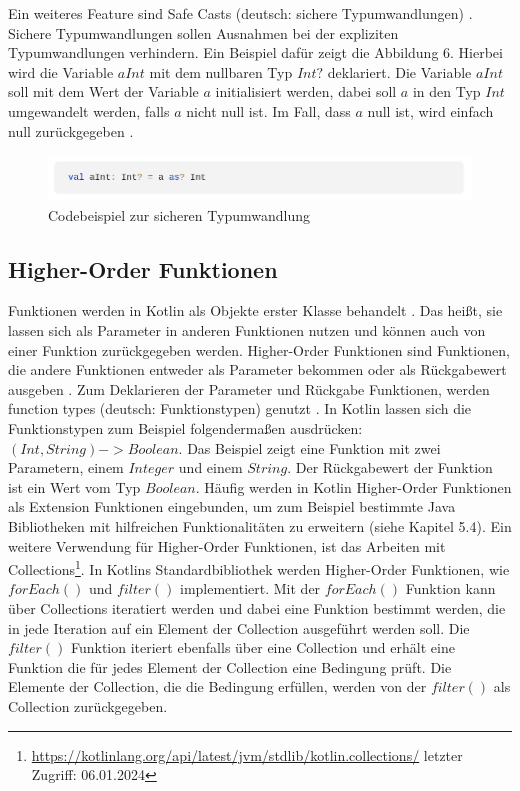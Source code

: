 \documentclass{article}
\begin{document}
Ein weiteres Feature sind Safe Casts (deutsch: sichere Typumwandlungen) \cite{KotlinLangDoc}. Sichere Typumwandlungen sollen Ausnahmen bei der expliziten Typumwandlungen verhindern. Ein Beispiel dafür zeigt die Abbildung 6. Hierbei wird die Variable $aInt$ mit dem nullbaren Typ $Int?$ deklariert. Die Variable $aInt$ soll mit dem Wert der Variable $a$ initialisiert werden, dabei soll $a$ in den Typ $Int$ umgewandelt werden, falls $a$ nicht null ist. Im Fall, dass $a$ null ist, wird einfach null zurückgegeben \cite{KotlinLangDoc}.
\begin{figure}[!htb]
    \centering
    \includegraphics[width=\linewidth]{img/SafeCast.png}
    \caption{Codebeispiel zur sicheren Typumwandlung\footnotemark}
\end{figure}

\subsection{Higher-Order Funktionen}
Funktionen werden in Kotlin als Objekte erster Klasse behandelt \cite{KotlinLangDocHigherOrder}. Das heißt, sie lassen sich als Parameter in anderen Funktionen nutzen und können auch von einer Funktion zurückgegeben werden. Higher-Order Funktionen sind Funktionen, die andere Funktionen entweder als Parameter bekommen oder als Rückgabewert ausgeben \cite{KotlinLangDocHigherOrder}. Zum Deklarieren der Parameter und Rückgabe Funktionen, werden function types (deutsch: Funktionstypen) genutzt \cite{KotlinLangDocHigherOrder}. In Kotlin lassen sich die Funktionstypen zum Beispiel folgendermaßen ausdrücken: $(Int, String) -> Boolean$. Das Beispiel zeigt eine Funktion mit zwei Parametern, einem $Integer$ und einem $String$. Der Rückgabewert der Funktion ist ein Wert vom Typ $Boolean$. Häufig werden in Kotlin Higher-Order Funktionen als Extension Funktionen eingebunden, um zum Beispiel bestimmte Java Bibliotheken mit hilfreichen Funktionalitäten zu erweitern (siehe Kapitel 5.4). Ein weitere Verwendung für Higher-Order Funktionen, ist das Arbeiten mit Collections\footnote{\url{https://kotlinlang.org/api/latest/jvm/stdlib/kotlin.collections/} letzter Zugriff: 06.01.2024}. In Kotlins Standardbibliothek werden Higher-Order Funktionen, wie $forEach()$ und $filter()$ implementiert. Mit der $forEach()$ Funktion kann über Collections iteratiert werden und dabei eine Funktion bestimmt werden, die in jede Iteration auf ein Element der Collection ausgeführt werden soll. Die $filter()$ Funktion iteriert ebenfalls über eine Collection und erhält eine Funktion die für jedes Element der Collection eine Bedingung prüft. Die Elemente der Collection, die die Bedingung erfüllen, werden von der $filter()$ als Collection zurückgegeben.
\end{document}
